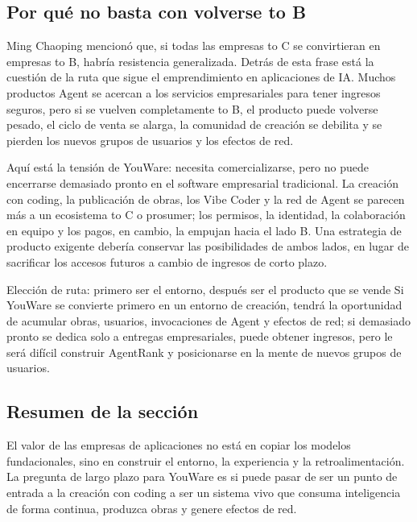 \subsection{Por qué no basta con volverse to B}

Ming Chaoping mencionó que, si todas las empresas to C se convirtieran en empresas to B, habría resistencia generalizada. Detrás de esta frase está la cuestión de la ruta que sigue el emprendimiento en aplicaciones de IA. Muchos productos Agent se acercan a los servicios empresariales para tener ingresos seguros, pero si se vuelven completamente to B, el producto puede volverse pesado, el ciclo de venta se alarga, la comunidad de creación se debilita y se pierden los nuevos grupos de usuarios y los efectos de red.

Aquí está la tensión de YouWare: necesita comercializarse, pero no puede encerrarse demasiado pronto en el software empresarial tradicional. La creación con coding, la publicación de obras, los Vibe Coder y la red de Agent se parecen más a un ecosistema to C o prosumer; los permisos, la identidad, la colaboración en equipo y los pagos, en cambio, la empujan hacia el lado B. Una estrategia de producto exigente debería conservar las posibilidades de ambos lados, en lugar de sacrificar los accesos futuros a cambio de ingresos de corto plazo.

\begin{importantbox}{Elección de ruta: primero ser el entorno, después ser el producto que se vende}
Si YouWare se convierte primero en un entorno de creación, tendrá la oportunidad de acumular obras, usuarios, invocaciones de Agent y efectos de red; si demasiado pronto se dedica solo a entregas empresariales, puede obtener ingresos, pero le será difícil construir AgentRank y posicionarse en la mente de nuevos grupos de usuarios.
\end{importantbox}

\subsection{Resumen de la sección}

El valor de las empresas de aplicaciones no está en copiar los modelos fundacionales, sino en construir el entorno, la experiencia y la retroalimentación. La pregunta de largo plazo para YouWare es si puede pasar de ser un punto de entrada a la creación con coding a ser un sistema vivo que consuma inteligencia de forma continua, produzca obras y genere efectos de red.
